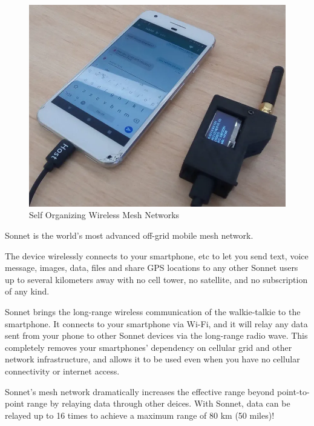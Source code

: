 				\noindent
				\begin{minipage}{0.48\textwidth}%
					\begin{figure}[H]
						\centering
						\includegraphics[width=\textwidth]{resources/img/chap4/lora-mesh-chat-5267d9}
						\caption[Self Organizing Wireless Mesh Networks]{Self Organizing Wireless Mesh Networks\cite{BADIS2015653}}
						\label{img:wms_microsoft}
					\end{figure}
				\end{minipage}%
				\hfill%
				\begin{minipage}{0.5\textwidth}\raggedright

Sonnet is the world's most advanced off-grid mobile mesh network.

The device wirelessly connects to your smartphone, etc to let you send text, voice message, images, data, files and share GPS locations to any other Sonnet users up to several kilometers away with no cell tower, no satellite, and no subscription of any kind.

Sonnet brings the long-range wireless communication of the walkie-talkie to the smartphone. It connects to your smartphone via Wi-Fi, and it will relay any data sent from your phone to other Sonnet devices via the long-range radio wave. This completely removes your smartphones’ dependency on cellular grid and other network infrastructure, and allows it to be used even when you have no cellular connectivity or internet access.

Sonnet's mesh network dramatically increases the effective range beyond point-to-point range by relaying data through other deices. With Sonnet, data can be relayed up to 16 times to achieve a maximum range of 80 km (50 miles)!
				\end{minipage}
		

